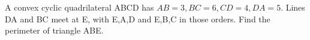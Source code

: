 A convex cyclic quadrilateral ABCD has $AB=3,BC=6,CD=4,DA=5$. Lines DA and BC meet at E, with E,A,D and E,B,C in those orders. Find the perimeter of triangle ABE.
